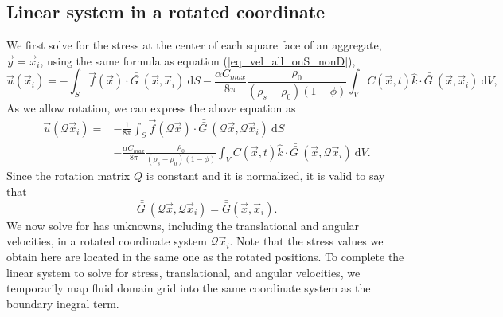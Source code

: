\subsection{Linear system in a rotated coordinate}
We first solve for the stress at the center of each square face of an aggregate, $\vec{y} = \vec{x}_i$, 
using the same formula as equation (\ref{eq_vel_all_onS_nonD}),
\begin{equation}
	\vec{u} \left(\vec{x}_i \right) 
		  = -\int_{S}  
		 \vec{f}(\vec{x}) 
		 \cdot \bar{\bar{G \ }} (\vec{x}, \vec{x}_i) 
		 \ \textrm{d}S 
		 - \frac{ \alpha C_{max}}{8\pi } \frac{\rho_0}{(\rho_s - \rho_0)(1-\phi)}
		 \int_V  C \left(\vec{x} ,t \right) \hat{k} \cdot
		 \bar{\bar{G \ }}(\vec{x}, \vec{x}_i)
		 \ \text{d}V,
		 \nonumber
\end{equation}
As we allow rotation, we can express the above equation as
\begin{align}
	\vec{u} \left(\mathcal{Q} \vec{x}_i \right) 
		  = & - \frac{1}{8 \pi} \int_{S}  
		 \vec{f}(\mathcal{Q} \vec{x}) 
		 \cdot \bar{\bar{G \ }} (\mathcal{Q} \vec{x},\mathcal{Q}\vec{x}_i) 
		 \ \textrm{d}S
		 \nonumber \\
		 & - \frac{ \alpha C_{max}}{8\pi } \frac{\rho_0}{(\rho_s - \rho_0)(1-\phi)}
		 \int_V  C \left(\vec{x} ,t \right) \hat{k} \cdot
		 \bar{\bar{G \ }}(\vec{x}, \mathcal{Q} \vec{x}_i)
		 \ \text{d}V.
	\label{eq_slp_On_rotate}
\end{align}
Since the rotation matrix $Q$ is constant and it is normalized, it is valid to say that
\[
 \bar{\bar{G \ }} (\mathcal{Q} \vec{x},\mathcal{Q}\vec{x}_i) 
	 = \bar{\bar{G}}( \vec{x}, \vec{x}_i).
\]
We now solve for has unknowns, including the translational and angular velocities,
in a rotated coordinate system $\mathcal{Q} \vec{x}_i $.
Note that the stress values we obtain here 
are located in the same one as the rotated positions.  
To complete the linear system to solve for stress, translational, and angular velocities, we temporarily map fluid domain grid into the same coordinate system as the boundary inegral term.
